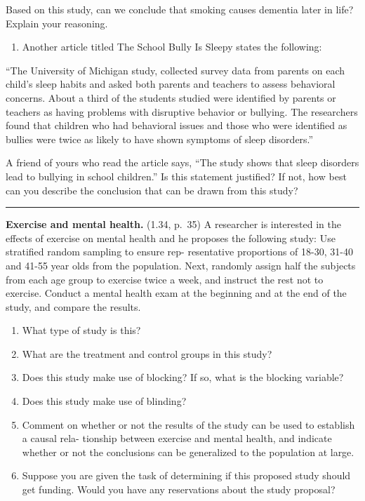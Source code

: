 \documentclass[
]{article}
\providecommand{\tightlist}{%
  \setlength{\itemsep}{0pt}\setlength{\parskip}{0pt}}
\begin{document}
Based on this study, can we conclude that smoking causes dementia later
in life? Explain your reasoning.

\begin{enumerate}
\def\labelenumi{(\alph{enumi})}
\setcounter{enumi}{1}
\tightlist
\item
  Another article titled The School Bully Is Sleepy states the
  following:
\end{enumerate}

``The University of Michigan study, collected survey data from parents
on each child's sleep habits and asked both parents and teachers to
assess behavioral concerns. About a third of the students studied were
identified by parents or teachers as having problems with disruptive
behavior or bullying. The researchers found that children who had
behavioral issues and those who were identified as bullies were twice as
likely to have shown symptoms of sleep disorders.''

A friend of yours who read the article says, ``The study shows that
sleep disorders lead to bullying in school children.'' Is this statement
justified? If not, how best can you describe the conclusion that can be
drawn from this study?

\begin{center}\rule{0.5\linewidth}{0.5pt}\end{center}

\clearpage

\textbf{Exercise and mental health.} (1.34, p.~35) A researcher is
interested in the effects of exercise on mental health and he proposes
the following study: Use stratified random sampling to ensure rep-
resentative proportions of 18-30, 31-40 and 41-55 year olds from the
population. Next, randomly assign half the subjects from each age group
to exercise twice a week, and instruct the rest not to exercise. Conduct
a mental health exam at the beginning and at the end of the study, and
compare the results.

\begin{enumerate}
\def\labelenumi{(\alph{enumi})}
\tightlist
\item
  What type of study is this?
\item
  What are the treatment and control groups in this study?
\item
  Does this study make use of blocking? If so, what is the blocking
  variable?
\item
  Does this study make use of blinding?
\item
  Comment on whether or not the results of the study can be used to
  establish a causal rela- tionship between exercise and mental health,
  and indicate whether or not the conclusions can be generalized to the
  population at large.
\item
  Suppose you are given the task of determining if this proposed study
  should get funding. Would you have any reservations about the study
  proposal?
\end{enumerate}
\end{document}
